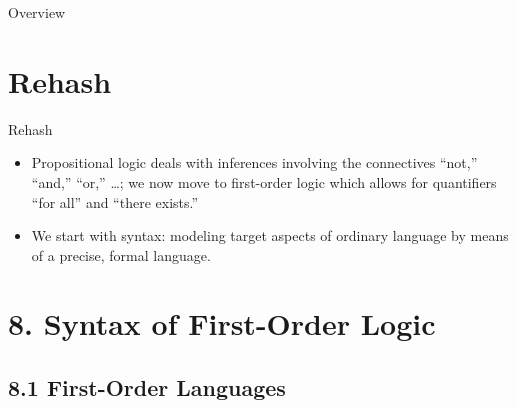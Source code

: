 
\begin{frame}
  \setcounter{framenumber}{219}
  \maketitle
\end{frame}

\begin{frame}{Overview}
\tableofcontents
\end{frame}

\section{Rehash}
\begin{frame}{Rehash}
	
	\begin{itemize}%
	\itemsep=16pt
	
	\item Propositional logic deals with inferences involving the connectives ``not,'' ``and,'' ``or,'' \dots; \alert{we now move to first-order logic which allows for quantifiers ``for all'' and ``there exists.''}

	\item We start with syntax: modeling target aspects of ordinary language by means of a precise, formal language.
	
\end{itemize}

\end{frame}
		

\section{8. Syntax of First-Order Logic}
\subsection{8.1 First-Order Languages}

